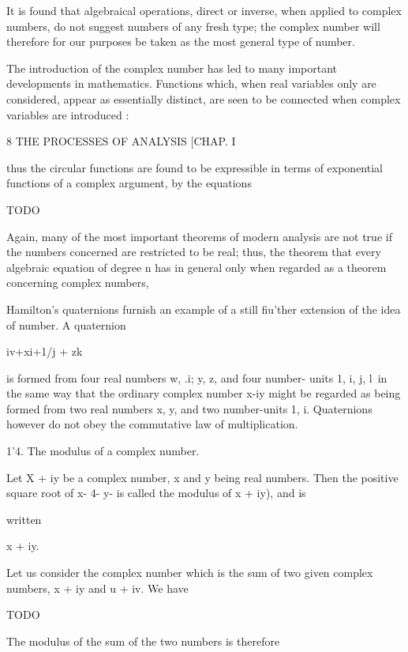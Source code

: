 It is found that algebraical operations, direct or inverse, when
applied to complex numbers, do not suggest numbers of any fresh type;
the complex number will therefore for our purposes be taken as the
most general type of number.

The introduction of the complex number has led to many important
developments in mathematics. Functions which, when real variables only
are considered, appear as essentially distinct, are seen to be
connected when complex variables are introduced :

8 THE PROCESSES OF ANALYSIS [CHAP. I

thus the circular functions are found to be expressible in terms of
exponential functions of a complex argument, by the equations

TODO

Again, many of the most important theorems of modern analysis are not
true if the numbers concerned are restricted to be real; thus, the
theorem that every algebraic equation of degree n has %
in general only when regarded as a theorem concerning complex numbers,

Hamilton's quaternions furnish an example of a still fiu'ther
extension of the idea of number. A quaternion

iv+xi+1/j + zk

is formed from four real numbers w, .i; y, z, and four number- units
1, i, j, l\ in the same way that the ordinary complex number x-\-iy
might be regarded as being formed from two real numbers x, y, and two
number-units 1, i. Quaternions however do not obey the commutative law
of multiplication.

1'4. The modulus of a complex number.

Let X + iy be a complex number, x and y being real numbers. Then the
positive square root of x- 4- y- is called the modulus of x + iy), and
is

written

x + iy.

Let us consider the complex number which is the sum of two given
complex numbers, x + iy and u + iv. We have

TODO

The modulus of the sum of the two numbers is therefore

